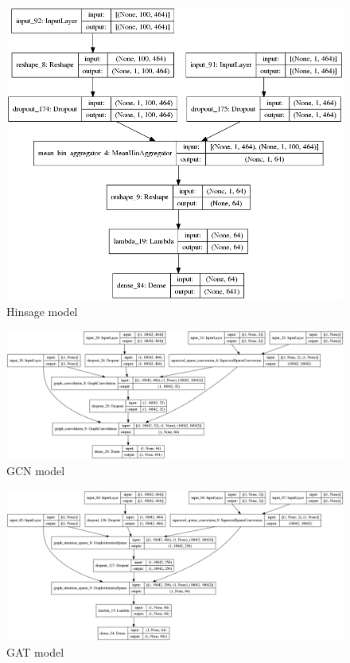 \documentclass[10pt]{beamer}
\begin{document}
\begin{frame}
	\begin{figure}
		\includegraphics[height=0.9\textheight]{../../models/hinsage_model.png}
		\caption{Hinsage model}
	\end{figure}
\end{frame}

\begin{frame}
	\begin{figure}
		\includegraphics[width=\linewidth]{../../models/gcn_model.png}
		\caption{GCN model}
	\end{figure}
\end{frame}

\begin{frame}
	\begin{figure}
		\includegraphics[width=\linewidth]{../../models/gat_model.png}
		\caption{GAT model}
	\end{figure}
\end{frame}
\end{document}
